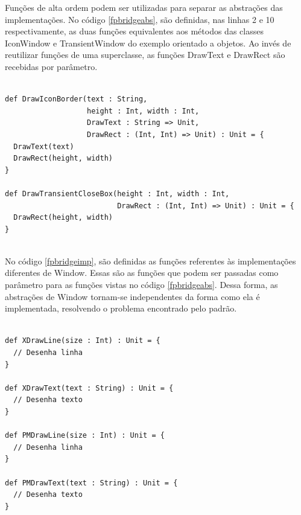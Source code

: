 Funções de alta ordem podem ser utilizadas 
para separar as abstrações das implementações. 
No código \ref{fpbridgeabs}, são definidas, nas 
linhas 2 e 10 respectivamente, as 
duas funções equivalentes aos métodos das 
classes IconWindow e TransientWindow do exemplo 
orientado a objetos. Ao invés de reutilizar 
funções de uma superclasse, as funções 
DrawText e DrawRect são recebidas por parâmetro.

\begin{lstlisting}[caption={Abstrações no Bridge Funcional},label=fpbridgeabs]
    
def DrawIconBorder(text : String,
                   height : Int, width : Int,
                   DrawText : String => Unit,
                   DrawRect : (Int, Int) => Unit) : Unit = {
  DrawText(text)
  DrawRect(height, width)
}

def DrawTransientCloseBox(height : Int, width : Int,
                          DrawRect : (Int, Int) => Unit) : Unit = {
  DrawRect(height, width)
}
    
\end{lstlisting}

No código \ref{fpbridgeimp}, são definidas as 
funções referentes às implementações diferentes 
de Window. Essas são as funções que podem ser 
passadas como parâmetro para as funções vistas 
no código \ref{fpbridgeabs}. Dessa forma, as 
abstrações de Window tornam-se independentes 
da forma como ela é implementada, resolvendo 
o problema encontrado pelo padrão.

\begin{lstlisting}[caption={Implementaçoes no Bridge Funcional},label=fpbridgeimp]
    
def XDrawLine(size : Int) : Unit = {
  // Desenha linha
}

def XDrawText(text : String) : Unit = {
  // Desenha texto
}

def PMDrawLine(size : Int) : Unit = {
  // Desenha linha
}

def PMDrawText(text : String) : Unit = {
  // Desenha texto
}
    
\end{lstlisting}